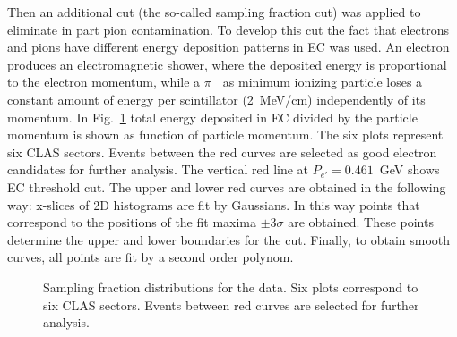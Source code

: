 Then an additional cut (the so-called sampling fraction cut) was applied to  eliminate in part pion contamination. To develop this cut the fact that electrons and pions
have different  energy deposition patterns in EC was used. An electron produces an electromagnetic shower, where the
deposited energy is proportional to the electron momentum, while a $\pi^{-}$ as  minimum ionizing particle loses a constant
amount of energy per scintillator (2~MeV/cm) independently of its momentum. In Fig.~\ref{fig:ec_cut_data} total energy deposited in EC divided by the particle momentum is shown as function of particle momentum. The six plots represent six CLAS sectors. Events between the red curves are selected as good electron candidates for further analysis. The vertical red line at $P_{e'} = 0.461$~GeV shows EC threshold cut. The upper and lower red curves are obtained in the following way:  x-slices of 2D histograms are fit by Gaussians. In this way points that correspond to the positions of the fit maxima $\pm 3\sigma$ are obtained. These points determine the upper and lower boundaries for the cut. Finally, to obtain smooth curves, all points are fit by a second order polynom.  

\begin{figure}[htp]
\begin{center}
\caption{\small Sampling fraction distributions for the data. Six plots correspond to six CLAS sectors. Events between red curves are selected for further analysis.} \label{fig:ec_cut_data}
\end{center}
\end{figure}

